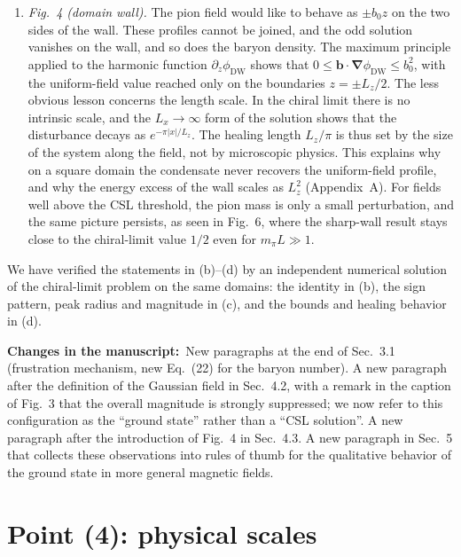 \documentclass[11pt,a4paper]{article}
\newcommand{\vek}[1]{\bm{#1}}
\newcommand{\grad}{\vek\nabla}
\newcommand{\changes}{\par\smallskip\noindent\textbf{Changes in the manuscript:}\ }
\begin{document}
\begin{enumerate}[label=(\alph*)]
\item \emph{Fig.~4 (domain wall).} The pion field would like to behave as $\pm b_0z$ on the two sides of the wall. These profiles cannot be joined, and the odd solution vanishes on the wall, and so does the baryon density. The maximum principle applied to the harmonic function $\partial_z\phi_\text{DW}$ shows that $0\leq\vek b\cdot\grad\phi_\text{DW}\leq b_0^2$, with the uniform-field value reached only on the boundaries $z=\pm L_z/2$. The less obvious lesson concerns the length scale. In the chiral limit there is no intrinsic scale, and the $L_x\to\infty$ form of the solution shows that the disturbance decays as $e^{-\pi|x|/L_z}$. The healing length $L_z/\pi$ is thus set by the size of the system along the field, not by microscopic physics. This explains why on a square domain the condensate never recovers the uniform-field profile, and why the energy excess of the wall scales as $L_z^2$ (Appendix~A). For fields well above the CSL threshold, the pion mass is only a small perturbation, and the same picture persists, as seen in Fig.~6, where the sharp-wall result stays close to the chiral-limit value $1/2$ even for $m_\pi L\gg1$.
\end{enumerate}

We have verified the statements in (b)--(d) by an independent numerical solution of the chiral-limit problem on the same domains: the identity in (b), the sign pattern, peak radius and magnitude in (c), and the bounds and healing behavior in (d).

\changes New paragraphs at the end of Sec.~3.1 (frustration mechanism, new Eq.~(22) for the baryon number). A new paragraph after the definition of the Gaussian field in Sec.~4.2, with a remark in the caption of Fig.~3 that the overall magnitude is strongly suppressed; we now refer to this configuration as the ``ground state'' rather than a ``CSL solution''. A new paragraph after the introduction of Fig.~4 in Sec.~4.3. A new paragraph in Sec.~5 that collects these observations into rules of thumb for the qualitative behavior of the ground state in more general magnetic fields.

\section*{Point (4): physical scales}
\end{document}
